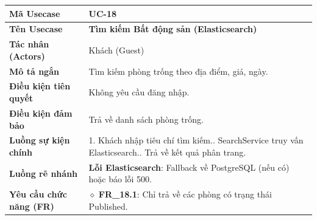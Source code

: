 \begin{table}[H]
\renewcommand{\arraystretch}{1.3}
\centering
\begin{tabularx}{\textwidth}{|p{4.5cm}|X|}
\hline
\cellcolor{gray!15}\bfseries Mã Usecase & \textbf{UC-18} \\ \hline
\cellcolor{gray!15}\bfseries Tên Usecase & \textbf{Tìm kiếm Bất động sản (Elasticsearch)} \\ \hline
\cellcolor{gray!15}\bfseries Tác nhân (Actors) & Khách (Guest) \\ \hline
\cellcolor{gray!15}\bfseries Mô tả ngắn & Tìm kiếm phòng trống theo địa điểm, giá, ngày. \\ \hline
\cellcolor{gray!15}\bfseries Điều kiện tiên quyết & Không yêu cầu đăng nhập. \\ \hline
\cellcolor{gray!15}\bfseries Điều kiện đảm bảo & Trả về danh sách phòng trống. \\ \hline
\cellcolor{gray!15}\bfseries Luồng sự kiện chính & 1. Khách nhập tiêu chí tìm kiếm.\newline 2. SearchService truy vấn Elasticsearch.\newline 3. Trả về kết quả phân trang. \\ \hline
\cellcolor{gray!15}\bfseries Luồng rẽ nhánh & \textbf{Lỗi Elasticsearch}: Fallback về PostgreSQL (nếu có) hoặc báo lỗi 500. \\ \hline
\cellcolor{gray!15}\bfseries Yêu cầu chức năng (FR) & $\diamond$ \textbf{FR\_18.1}: Chỉ trả về các phòng có trạng thái Published. \\ \hline
\end{tabularx}
\end{table}

